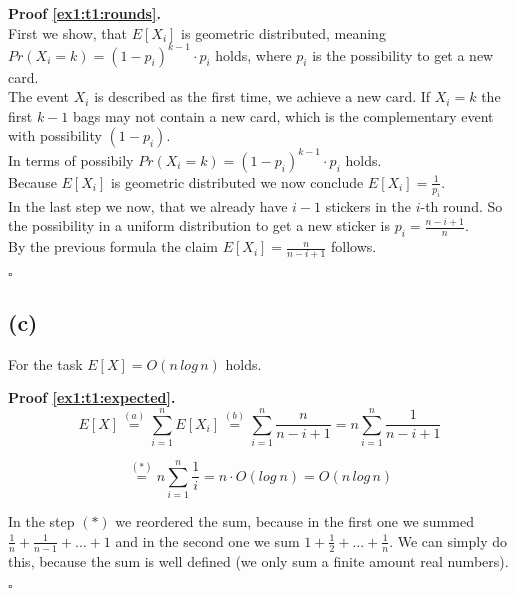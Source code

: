 \textbf{Proof \ref{ex1:t1:rounds}.}\\
First we show, that $E[ X_i ]$ is geometric distributed, meaning\\
$Pr (X_i = k) = (1 - p_i)^{k-1} \cdot p_i$ holds,
where $p_i$ is the possibility to get a new card.\\

The event $X_i$ is described as the first time, we achieve a new card. If $X_i = k$ the first $k-1$ bags
may not contain a new card, which is the complementary event with possibility $(1- p_i)$.\\

In terms of possibily $Pr(X_i = k) = (1 - p_i)^{k-1} \cdot p_i$ holds.\\

Because $E [X_i ]$ is geometric distributed we now conclude
$E[ X_i ] = \frac{1}{p_i}$.\\

In the last step we now, that we already have $i-1$ stickers in the $i$-th round. So the possibility
in a uniform distribution to get a new sticker is $p_i = \frac{n - i + 1}{n}$.\\
By the previous formula the claim $E[ X_i ] = \frac{n}{n - i + 1}$ follows.

\mbox{} \hfill $\square$


\subsection*{(c)}

\begin{lemma}\label{ex1:t1:expected}
    For the task $E[X]=O(n\, log\, n)$ holds.
\end{lemma}


\textbf{Proof \ref{ex1:t1:expected}.}\\
\[
E[X]\stackrel{(a)}{=}\sum_{i=1}^{n}E[X_{i}]\stackrel{(b)}{=}\sum_{i=1}^{n}\frac{n}{n-i+1}=n\sum_{i=1}^{n}\frac{1}{n-i+1}
\]


\[
\stackrel{(*)}{=}n\sum_{i=1}^{n}\frac{1}{i}=n\cdot O(log\: n)=O(n\, log\, n)
\]


In the step $(*)$ we reordered the sum, because in the first one we summed $\frac{1}{n} + \frac{1}{n-1} + ... + 1$ and in the second one
we sum $1 + \frac{1}{2} + ... + \frac{1}{n}$. We can simply do this, because the sum is well defined (we only sum a finite amount
real numbers).

\mbox{} \hfill $\square$

